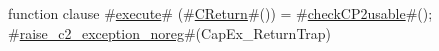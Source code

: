 function clause #\hyperref[zexecute]{execute}# (#\hyperref[zCReturn]{CReturn}#()) =
{
  #\hyperref[zcheckCP2usable]{checkCP2usable}#();
  #\hyperref[zraisezyc2zyexceptionzynoreg]{raise\_c2\_exception\_noreg}#(CapEx_ReturnTrap)
}
